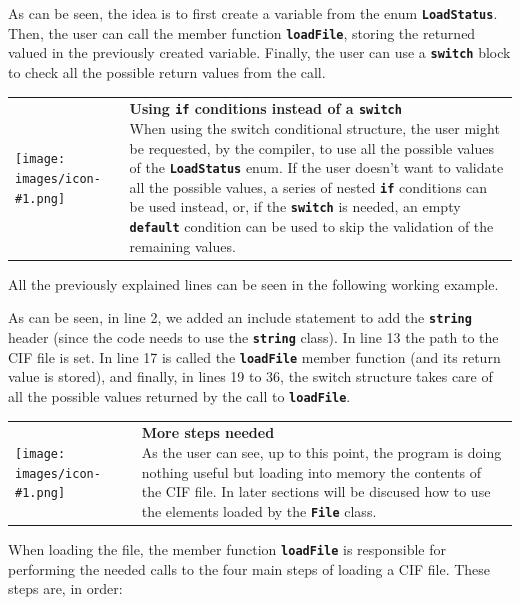 \documentclass[11pt,twoside,openany,x11names,svgnames]{memoir}
\makeatletter
\newcommand{\IconNote}[3]
{
	\begin{table}[ht]
	\begin{tabular}{ lm{\dimexpr\textwidth-8\tabcolsep-\wd0}@{}}
		\toprule
		\texttt{[image: images/icon-\#1.png]}
		&
		\parbox[t]{155mm}{
		\textbf{#2} \\
		#3
		}
	\end{tabular}
\end{table}
}
\makeatother
\begin{document}
As can be seen, the idea is to first create a variable from the enum \textbf{\texttt{LoadStatus}}. Then, the user can call the member function \textbf{\texttt{loadFile}}, storing the returned valued in the previously created variable. Finally, the user can use a \textbf{\texttt{switch}} block to check all the possible return values from the call.

\IconNote
	{info}
	{Using \textbf{\texttt{if}} conditions instead of a \textbf{\texttt{switch}}}
	{When using the switch conditional structure, the user might be requested, by the compiler, to use all the possible values of the \textbf{\texttt{LoadStatus}} enum. If the user doesn't want to validate all the possible values, a series of nested \textbf{\texttt{if}} conditions can be used instead, or, if the \textbf{\texttt{switch}} is needed, an empty \textbf{\texttt{default}} condition can be used to skip the validation of the remaining values.}
	
All the previously explained lines can be seen in the following working example.



As can be seen, in line 2, we added an include statement to add the \textbf{\texttt{string}} header (since the code needs to use the \textbf{\texttt{string}} class). In line 13 the path to the CIF file is set. In line 17 is called the \textbf{\texttt{loadFile}} member function (and its return value is stored), and finally, in lines 19 to 36, the switch structure takes care of all the possible values returned by the call to \textbf{\texttt{loadFile}}.

\IconNote
	{info}
	{More steps needed}
	{As the user can see, up to this point, the program is doing nothing useful but loading into memory the contents of the CIF file. In later sections will be discused how to use the elements loaded by the \textbf{\texttt{File}} class.}
	
When loading the file, the member function \textbf{\texttt{loadFile}} is responsible for performing the needed calls to the four main steps of loading a CIF file. These steps are, in order:
\end{document}
